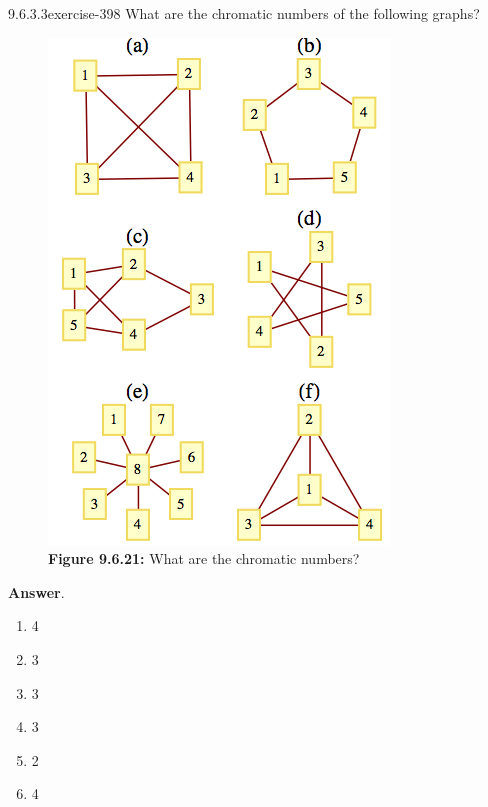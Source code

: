 \documentclass[twoside,10pt,]{book}
\numberwithin{equation}{section}
\begin{document}
\begin{divisionsolution}{9.6.3.3}{}{exercise-398}%
\hypertarget{p-3481}{}%
What are the chromatic numbers of the following graphs?%
\begin{figure}
\centering
\includegraphics[width=0.7\linewidth]{images/fig-exercise-9-6-3.png}
\caption*{\textbf{Figure 9.6.21:} What are the chromatic numbers?}
\end{figure}
\par\smallskip%
\noindent\textbf{Answer}.\quad%
\hypertarget{p-3482}{}%
\leavevmode%
\begin{multicols}{3}
\begin{enumerate}[label=(\alph*)]
\item\hypertarget{li-1621}{}\hypertarget{p-3483}{}%
4%
\item\hypertarget{li-1622}{}\hypertarget{p-3484}{}%
3%
\item\hypertarget{li-1623}{}\hypertarget{p-3485}{}%
3%
\item\hypertarget{li-1624}{}\hypertarget{p-3486}{}%
3%
\item\hypertarget{li-1625}{}\hypertarget{p-3487}{}%
2%
\item\hypertarget{li-1626}{}\hypertarget{p-3488}{}%
4%
\end{enumerate}
\end{multicols}
%
\end{divisionsolution}%
\end{document}
